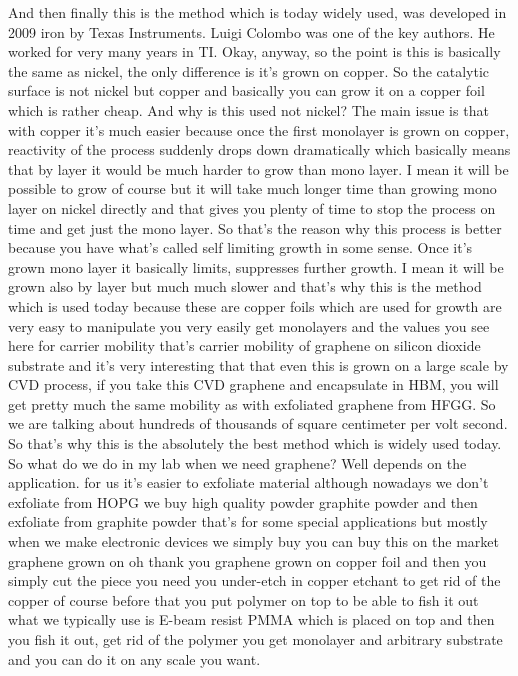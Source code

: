 And then finally this is the method which is today widely used, was developed in 2009 iron by Texas Instruments. Luigi Colombo was one of the key authors. He worked for very many years in TI. Okay, anyway, so the point is this is basically the same as nickel, the only difference is it's grown on copper. So the catalytic surface is not nickel but copper and basically you can grow it on a copper foil which is rather cheap. And why is this used not nickel? The main issue is that with copper it's much easier because once the first monolayer is grown on copper, reactivity of the process suddenly drops down dramatically which basically means that by layer it would be much harder to grow than mono layer. I mean it will be possible to grow of course but it will take much longer time than growing mono layer on nickel directly and that gives you plenty of time to stop the process on time and get just the mono layer. So that's the reason why this process is better because you have what's called self limiting growth in some sense. Once it's grown mono layer it basically limits, suppresses further growth. I mean it will be grown also by layer but much much slower and that's why this is the method which is used today because these are copper foils which are used for growth are very easy to manipulate you very easily get monolayers and the values you see here for carrier mobility that's carrier mobility of graphene on silicon dioxide substrate and it's very interesting that that even this is grown on a large scale by CVD process, if you take this CVD graphene and encapsulate in HBM, you will get pretty much the same mobility as with exfoliated graphene from HFGG. So we are talking about hundreds of thousands of square centimeter per volt second. So that's why this is the absolutely the best method which is widely used today. So what do we do in my lab when we need graphene? Well depends on the application. for us it's easier to exfoliate material although nowadays we don't exfoliate from HOPG we buy high quality powder graphite powder and then exfoliate from graphite powder that's for some special applications but mostly when we make electronic devices we simply buy you can buy this on the market graphene grown on oh thank you graphene grown on copper foil and then you simply cut the piece you need you under-etch in copper etchant to get rid of the copper of course before that you put polymer on top to be able to fish it out what we typically use is E-beam resist PMMA which is placed on top and then you fish it out, get rid of the polymer you get monolayer and arbitrary substrate and you can do it on any scale you want.
